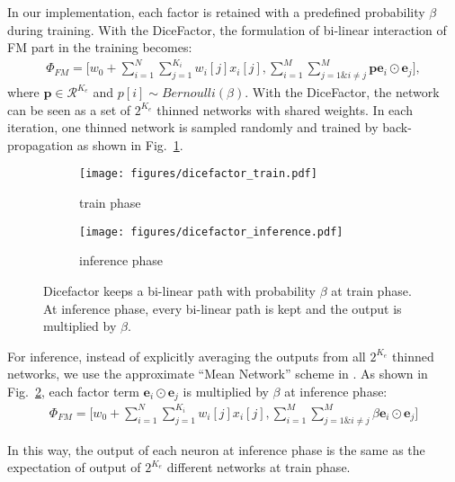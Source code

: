 \documentclass[sigconf]{acmart}
\newcommand{\Real}{\mathcal{R}}
\begin{document}
In our implementation, each factor is retained with a predefined probability $\beta$ during training. With the DiceFactor, the formulation of bi-linear interaction of FM part in the training becomes:
\begin{equation}\label{eq:drop}
\begin{aligned}
\Phi_{FM}=\Big[w_0 + \sum_{i=1}^{N}\sum_{j=1}^{K_i} w_{i}[j] x_{i}[j], \sum_{i=1}^M \sum_{j=1 \&i \neq j}^M \mathbf{p}  \mathbf{e}_i\odot \mathbf{e}_j\Big],
\end{aligned}
\end{equation}
where $\mathbf{p} \in \Real^{K_{e}}$ and $p[i] \sim Bernoulli(\beta)$. With the DiceFactor, the network can be seen as a set of $2^{K_{e}}$ thinned networks with shared weights. In each iteration, one thinned network is sampled randomly and trained by back-propagation as shown in Fig.~\ref{fig::subfig::a}.

\begin{figure}[htbp]
\centering
  \begin{subfigure}{0.48\linewidth}
    \texttt{[image: figures/dicefactor\_train.pdf]}
    \caption{train phase}
    \label{fig::subfig::a}
  \end{subfigure}
  \begin{subfigure}{0.48\linewidth}
    \texttt{[image: figures/dicefactor\_inference.pdf]}
    \caption{inference phase}
    \label{fig::subfig::b}
  \end{subfigure}
  \caption{Dicefactor keeps a bi-linear path with probability $\beta$ at train phase. At inference phase, every bi-linear path is kept and the output is multiplied by $\beta$.}
  \label{fig::subfig}
\end{figure}

For inference, instead of explicitly averaging the outputs from all $2^{K_{e}}$ thinned networks, we use the approximate ``Mean Network'' scheme in \citep{srivastava2014dropout}. As shown in Fig.~\ref{fig::subfig::b}, 
each factor term $\mathbf{e}_i\odot \mathbf{e}_j$ is multiplied by $\beta$ at inference phase:
\begin{equation}\label{eq:drop_test}
\begin{aligned}
\Phi_{FM}=\Big[w_0 + \sum_{i=1}^{N}\sum_{j=1}^{K_i} w_{i}[j] x_{i}[j], \sum_{i=1}^M \sum_{j=1 \&i \neq j}^M \beta \mathbf{e}_i\odot \mathbf{e}_j\Big]
\end{aligned}
\end{equation}

In this way, the output of each neuron at inference phase is the same as the expectation of output of $2^{K_{e}}$ different networks at train phase.
\end{document}
